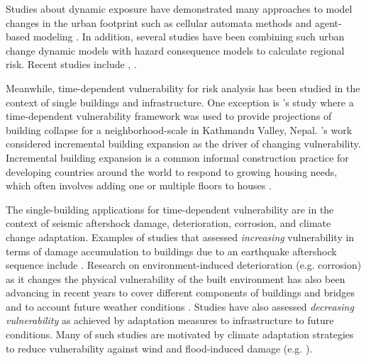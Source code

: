 Studies about dynamic exposure have demonstrated many approaches to model changes in the urban footprint such as cellular automata methods \citep{chaudhuri2013sleuth, white1993fractal} and agent-based modeling \citep{huang2014review, parker2008conceptual}. In addition, several studies have been combining such urban change dynamic models with hazard consequence models to calculate regional risk. Recent studies include \citet{deierlein2021state, mesta2022urban, williams2022regional, calderon2021exposure, cremen2022simulation, hemmati2021shaping, sarica2020spatio, haer2020safe}, .

Meanwhile, time-dependent vulnerability for risk analysis has been studied in the context of single buildings and infrastructure. One exception is \citet{lallemant2017framework}'s study where a time-dependent vulnerability framework was used to provide projections of building collapse for a neighborhood-scale in Kathmandu Valley, Nepal. \citep{lallemant2017framework}'s work considered incremental building expansion as the driver of changing vulnerability. Incremental building expansion is a common informal construction practice for developing countries around the world to respond to growing housing needs, which often involves adding one or multiple floors to houses \citep{amoako2017build, ferguson2010finance}.

The single-building applications for time-dependent vulnerability are in the context of seismic aftershock damage, deterioration, corrosion, and climate change adaptation. Examples of studies that assessed \textit{increasing} vulnerability in terms of damage accumulation to buildings due to an earthquake aftershock sequence include \cite{raghunandan2015aftershock, aljawhari2021effects, gentile2021hysteretic, papadopoulos2021exploring}. Research on environment-induced deterioration (e.g. corrosion) as it changes the physical vulnerability of the built environment has also been advancing in recent years to cover different components of buildings and bridges \citep{kashani2019residual, amaya2019reliability, guo2019critical, zanini2020seismic, rao2017development, zamanian2020high} and to account future weather conditions \citep{bastidas2015damage, bastidas2016economic, wang2012impact, stewart2012climate, el2010reliability, yang2019societal, sevieri2021typhoon}. Studies have also assessed \textit{decreasing vulnerability} as achieved by adaptation measures to infrastructure to future conditions. Many of such studies are motivated by climate adaptation strategies to reduce vulnerability against wind and flood-induced damage (e.g. \citet{stewart2014climate, dong2017adaptation, li2011cyclone, qin2020risk,ward2017global}). 

